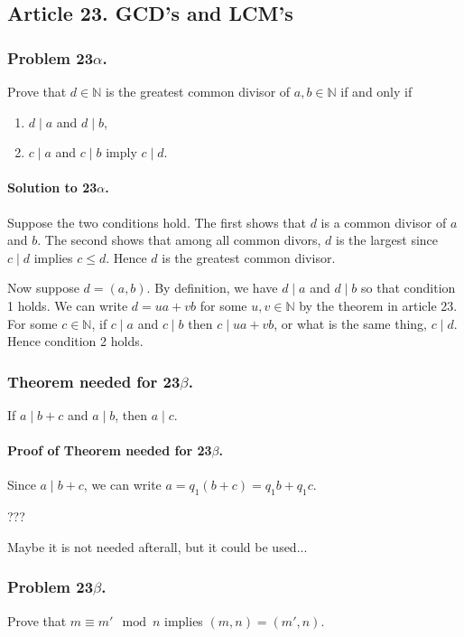 \subsection{Article 23. GCD's and LCM's}
\subsubsection{Problem 23$\alpha$.}
Prove that $ d \in \mathbb{N} $ is the greatest common divisor of $ a, b \in
\mathbb{N} $ if and only if
\begin{enumerate}
\item $ d \mid a $ and $ d \mid b $,
\item $ c \mid a $ and $ c \mid b $ imply $ c \mid d $.
\end{enumerate}

\paragraph*{Solution to 23$\alpha$.}
Suppose the two conditions hold. The first shows that $ d $ is a common divisor
of $ a $ and $ b $. The second shows that among all common divors,
$ d $ is the largest since $ c \mid d $ implies $ c \leq d $. Hence $ d $ is
the greatest common divisor.

Now suppose $ d = (a, b) $. By definition, we have $ d \mid a $ and $ d \mid b $
so that condition 1 holds.
We can write $ d = ua + vb $ for some $ u, v \in \mathbb{N} $ by the theorem
in article 23. For some $ c \in \mathbb{N} $, if $ c \mid a $ and $ c \mid b $
then $ c \mid ua + vb $, or what is the same thing, $ c \mid d $. Hence condition
2 holds.

\subsubsection{Theorem needed for 23$\beta$.}
If $ a \mid b + c $ and $ a \mid b $, then $ a \mid c $.

\paragraph*{Proof of Theorem needed for 23$\beta$.}
Since $ a \mid b + c$, we can write $ a = q_1 (b +c) = q_1 b + q_1 c$.

???

Maybe it is not needed afterall, but it could be used...

\subsubsection{Problem 23$\beta$.}
Prove that $ m \equiv m' \mod n $ implies $ (m,n) = (m', n)$.

